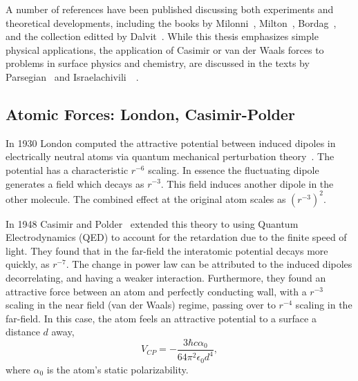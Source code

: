 A number of references have been published discussing both experiments and theoretical developments,
including the books by Milonni~\cite{Milonni1994}, Milton~\cite{Milton2001}, Bordag~\etal\cite{Bordag2009}, 
and the collection editted by Dalvit~\etal\cite{Dalvit2011}.  
While this thesis emphasizes simple physical applications, the application of Casimir or 
van der Waals forces to problems in surface physics and chemistry, are discussed in the texts by 
 Parsegian~\cite{Parsegian2006} and Israelachivili~\etal~\cite{Israelachvili2011}.


\subsection{Atomic Forces: London, Casimir-Polder}

In 1930 London computed the attractive potential between induced dipoles in electrically neutral
atoms via quantum mechanical perturbation theory~\cite{London1930}.  The potential has a characteristic $r^{-6}$ scaling.
In essence the fluctuating dipole generates a field which decays as $r^{-3}$.  This field induces another
dipole in the other molecule.  The combined effect at the original atom scales as $(r^{-3})^2$.  

In 1948 Casimir and Polder~\cite{CasimirPolder1948} extended this theory to using Quantum Electrodynamics
(QED) to account for the retardation due to the finite speed of light.  They found that in the 
far-field the interatomic potential decays more quickly, as $r^{-7}$.  The change in power law can be 
attributed to the induced dipoles decorrelating, and having a weaker interaction.  Furthermore,
they found an attractive force between an atom and perfectly conducting wall, with a $r^{-3}$ scaling
in the near field (van der Waals) regime, passing over to $r^{-4}$ scaling in the far-field.    
In this case, the atom feels an attractive potential to a surface a distance $d$ away,
\begin{equation}
  V_{CP} =-\frac{3\hbar c\alpha_0}{64\pi^2\epsilon_0 d^4},
\end{equation}
where $\alpha_0$ is the atom's static polarizability.  

